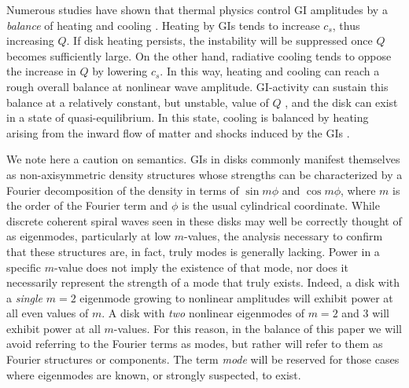 \documentclass[manuscript]{aastex}
\newcommand{\ACBc}[1]{{\color{red} #1}}
\begin{document}
Numerous studies have shown that thermal physics control GI amplitudes by a {\it balance} of heating and cooling \citep[e.g.,][]{tomley1991,tomley1994,pickett1998,pickett2000, pickett2003,gammie2001,boss2002,rice2003b,mejia2005,boley2006,boley2007b, stamatellos2008,cossins2009}.
Heating by GIs tends to increase $c_s$, thus increasing $Q$. If disk heating persists, the instability will be
suppressed once $Q$ becomes sufficiently large.  On the other hand, radiative cooling tends to oppose the increase in
$Q$ by lowering $c_s$. In this way, heating and cooling can reach a rough overall balance at nonlinear wave amplitude. GI-activity can sustain this balance  at a relatively constant,
but unstable, value of $Q$ \citep{paczynski1978, lin1981,goldreich1965}, and 
the disk can exist in a state of quasi-equilibrium. In this state, cooling is 
balanced by heating arising from the inward flow of matter and shocks induced by the GIs
\citep{gammie2001, lodato2004, rice2005, boley2006, cossins2009, vorobyov2010}.


We note here a caution on semantics.  GIs in disks commonly manifest themselves  as non-axisymmetric density structures whose strengths can be characterized 
by a Fourier decomposition of the density in terms of $\sin m\phi$ and $\cos m\phi$, where 
$m$ is the order of the Fourier term and $\phi$ is the usual 
cylindrical coordinate.  While discrete coherent spiral waves seen in these  disks may well be correctly thought of as eigenmodes, particularly 
at low $m$-values, the analysis necessary to confirm that these structures are, in fact, truly modes is generally lacking.
Power in a specific $m$-value does not imply the existence of that mode, nor does it necessarily represent the strength of a mode that truly exists.  Indeed, a disk with a {\it single} $m = 2$ eigenmode growing to nonlinear amplitudes will exhibit power at all even values of $m$.  A disk with {\it two} nonlinear eigenmodes of
$m = 2$ and 3 will exhibit power at all $m$-values.  
For this reason, in the balance of this paper we will avoid referring to the Fourier terms as modes, but rather will refer to them as Fourier structures or components.   The term {\it mode} will be reserved for those cases where eigenmodes are known, or strongly suspected, to exist.
\end{document}

